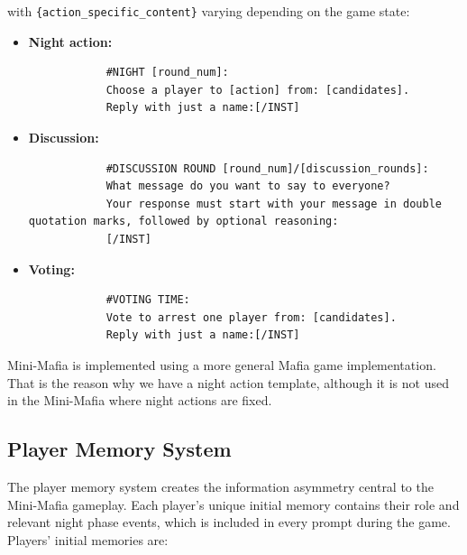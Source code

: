 \documentclass{article}
\begin{document}
with \texttt{\{action\_specific\_content\}} varying depending on the game state:

\begin{itemize}
    \item\textbf{Night action:}
    
    \begin{small}
        \begin{verbatim}
            #NIGHT [round_num]: 
            Choose a player to [action] from: [candidates].
            Reply with just a name:[/INST]
        \end{verbatim}
    \end{small}

    \item\textbf{Discussion:}

    \begin{small}
        \begin{verbatim}
            #DISCUSSION ROUND [round_num]/[discussion_rounds]: 
            What message do you want to say to everyone?
            Your response must start with your message in double quotation marks, followed by optional reasoning:
            [/INST]
        \end{verbatim}
    \end{small}
    
    \item\textbf{Voting:}
    
    \begin{small}
        \begin{verbatim}
            #VOTING TIME: 
            Vote to arrest one player from: [candidates].
            Reply with just a name:[/INST]
        \end{verbatim}
    \end{small}
\end{itemize}
Mini-Mafia is implemented using a more general Mafia game implementation. That is the reason why we have a night action template, although it is not used in the Mini-Mafia where night actions are fixed.

\subsection{Player Memory System}
\label{appendix:memory}

The player memory system creates the information asymmetry central to the Mini-Mafia gameplay. Each player's unique initial memory contains their role and relevant night phase events, which is included in every prompt during the game. Players' initial memories are:
\end{document}

